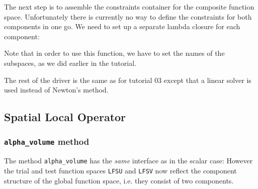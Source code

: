 \documentclass[a4paper,12pt]{article}
\theoremstyle{definition}
\theoremstyle{definition}
\begin{document}
The next step is to assemble the constraints container for the composite
function space. Unfortunately there is currently no way to define the
constraints for both components in one go. We need to
set up a separate lambda closure for each component:
% 
% 

% 

% 
Note that in order to use this function, we have to set the names of the subspaces,
as we did earlier in the tutorial.

The rest of the driver is the same as for tutorial 03 except that
a linear solver is used instead of Newton's method.

\subsection{Spatial Local Operator}


\subsubsection*{\lstinline{alpha_volume} method}

The method \lstinline{alpha_volume} has the \textit{same} interface
as in the scalar case:
%
However the trial and test function spaces \lstinline{LFSU} and \lstinline{LFSV}
now reflect the component structure of the global function space, i.e.
they consist of two components.
\end{document}

